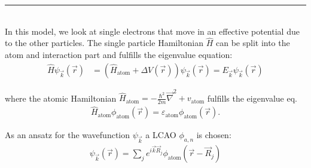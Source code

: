 \documentclass{article}
\newcommand{\lr}[1]{\left(#1\right)}
\begin{document}
{\color{violet}
\hrule
	\\
	In this model, we look at single electrons that move in an effective potential due to the other particles. The single particle Hamiltonian $\hat{H}$ can be split into the atom and interaction part and fulfills the eigenvalue equation:
		\begin{align*}
			\hat{H} \psi_{\vec{k}}(\vec{r}) &= \lr{ \hat{H}_\text{atom} + \Delta V(\vec{r}) } \psi_{\vec{k}}(\vec{r}) = E_{\vec{k}} \psi_{\vec{k}}(\vec{r})
		\end{align*}

where the atomic Hamiltonian $\hat{H}_\text{atom} = -\frac{\hbar^2}{2m}\vec{\nabla}^2 + v_{\text{atom}}$ fulfills the eigenvalue eq.
		\begin{align*}
			\hat{H}_\text{atom} \phi_\text{atom}(\vec{r}) = \varepsilon_\text{atom} \phi_\text{atom}(\vec{r}).
		\end{align*}

As an ansatz for the wavefunction $\psi_{\vec{k}}$ a LCAO $\phi_{a,n}$ is chosen:
		\begin{align*}
			\psi_{\vec{k}}(\vec{r}) = \sum_j e^{i\vec{k}\vec{R}_j} \phi_\text{atom}(\vec{r} - \vec{R}_j)
		\end{align*}

}
\end{document}
